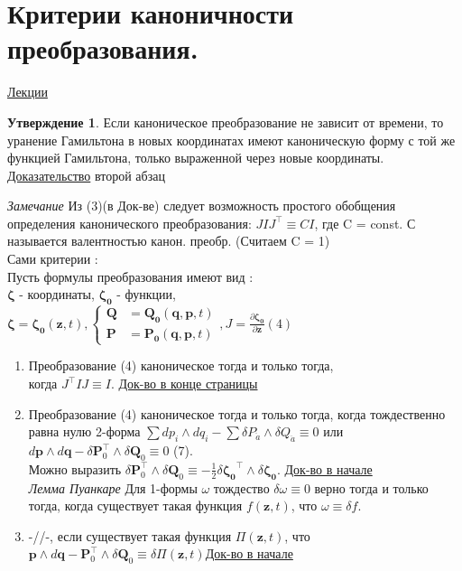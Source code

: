 \documentclass[specialist, subf, href, colorlinks=true, 12pt, times, mtpro, final]{disser}
\theoremstyle{definition}
\newtheorem{state}{Утверждение}[section]
\begin{document}
 \section{Критерии каноничности преобразования.}
     \label{17}
    \hyperlink {lects.25}{Лекции}
\begin{state}
Если каноническое преобразование не зависит от времени, то уранение Гамильтона в новых координатах имеют каноническую форму с той же функцией Гамильтона, только выраженной через новые координаты. \hyperlink {lects.25}{Доказательство} второй абзац
\end{state}
\emph{Замечание} Из (3)(в Док-ве) следует возможность простого обобщения определения канонического преобразования: $JIJ^\top \equiv CI$, где C = const. С называется валентностью канон. преобр. (Считаем C = 1)\\
Сами критерии :\\
Пусть формулы преобразования имеют вид :\\ $\mathbf{\zeta}$ - координаты, $\mathbf{\zeta_0}$ - функции, $\mathbf{\zeta} = \mathbf{\zeta_0}(\mathbf{z},t),
\left \lbrace
\begin{matrix}
\mathbf{Q} &= \mathbf{Q_0}(\mathbf{q}, \mathbf{p}, t)\\
\mathbf{P} &= \mathbf{P_0}(\mathbf{q}, \mathbf{p}, t) 
\end{matrix}
\right .
, 
J = \frac{\partial \mathbf{\zeta_0}}{\partial \mathbf{z}} (4)$\\
\begin{enumerate}
\item {Преобразование (4) каноническое тогда и только тогда, \\когда $J^\top IJ \equiv I$. \hyperlink {lects.25}{Док-во в конце страницы}}
\item {Преобразование (4) каноническое тогда и только тогда, когда тождественно равна нулю 2-форма $\sum dp_i \wedge dq_i - \sum \delta P_{\ddot a} \wedge \delta Q_{\ddot a} \equiv 0$ или $d\mathbf{p} \wedge d \mathbf{q} - \delta \mathbf{P}_0^\top\wedge \delta \mathbf{Q}_0 \equiv 0$ (7).\\
Можно выразить $\delta \mathbf{P}_0^\top\wedge \delta \mathbf{Q}_0 \equiv -\frac{1}{2}\delta \mathbf{\zeta_0}^\top \wedge \delta\mathbf{\zeta_0}$. \hyperlink {lects.26}{Док-во в начале}}\\
\emph{Лемма Пуанкаре} Для 1-формы $\omega$ тождество $\delta \omega \equiv 0$ верно тогда и только тогда, когда существует такая функция $f(\mathbf{z}, t)$, что $\omega \equiv \delta f$.
\item -//-, если существует такая функция $\Pi(\mathbf{z}, t)$, что\\ $\mathbf{p} \wedge d \mathbf{q} - \mathbf{P}_0^\top\wedge \delta \mathbf{Q}_0 \equiv \delta \Pi(\mathbf{z}, t)$\hyperlink {lects.27}{Док-во в начале}
\end{enumerate}
\end{document}
